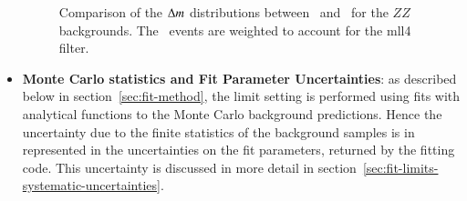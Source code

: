 \begin{itemize}
\begin{figure}[h]
{			
		}
		\caption{Comparison of the $\Delta m$ distributions between \powheg~and \sherpa~for the $ZZ$ backgrounds. The \powheg~events are weighted to account for the mll4 filter.}
		\label{fig:systematic-ZZ-shape}
	\end{figure}
	

	\item \textbf{Monte Carlo statistics and Fit Parameter Uncertainties}: as described below in section~\ref{sec:fit-method}, the limit setting is performed using fits with analytical functions to the Monte Carlo background predictions. Hence the uncertainty due to the finite statistics of the background samples is in represented in the uncertainties on the fit parameters, returned by the fitting code. This uncertainty is discussed in more detail in section~\ref{sec:fit-limits-systematic-uncertainties}.



\end{itemize}
